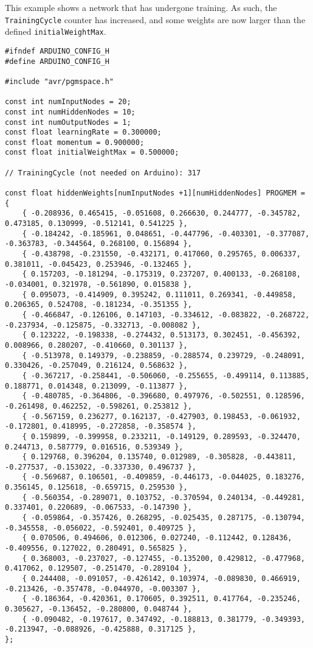 \documentclass[a4paper]{article}
\begin{document}
This example shows a network that has undergone training. As such, the \lstinline{TrainingCycle} counter has increased, and some weights are now larger than the defined \lstinline{initialWeightMax}.

\begin{lstlisting}
#ifndef ARDUINO_CONFIG_H
#define ARDUINO_CONFIG_H

#include "avr/pgmspace.h"

const int numInputNodes = 20;
const int numHiddenNodes = 10;
const int numOutputNodes = 1;
const float learningRate = 0.300000;
const float momentum = 0.900000;
const float initialWeightMax = 0.500000;

// TrainingCycle (not needed on Arduino): 317

const float hiddenWeights[numInputNodes +1][numHiddenNodes] PROGMEM = {
    { -0.208936, 0.465415, -0.051608, 0.266630, 0.244777, -0.345782, 0.473185, 0.130999, -0.512141, 0.541225 }, 
    { -0.184242, -0.185961, 0.048651, -0.447796, -0.403301, -0.377087, -0.363783, -0.344564, 0.268100, 0.156894 }, 
    { -0.438798, -0.231550, -0.432171, 0.417060, 0.295765, 0.006337, 0.381011, -0.045423, 0.253946, -0.132465 }, 
    { 0.157203, -0.181294, -0.175319, 0.237207, 0.400133, -0.268108, -0.034001, 0.321978, -0.561890, 0.015838 }, 
    { 0.095073, -0.414909, 0.395242, 0.111011, 0.269341, -0.449858, 0.206365, 0.524708, -0.181234, -0.351355 }, 
    { -0.466847, -0.126106, 0.147103, -0.334612, -0.083822, -0.268722, -0.237934, -0.125875, -0.332713, -0.008082 }, 
    { 0.123222, -0.198338, -0.274432, 0.513173, 0.302451, -0.456392, 0.008966, 0.280207, -0.410660, 0.301137 }, 
    { -0.513978, 0.149379, -0.238859, -0.288574, 0.239729, -0.248091, 0.330426, -0.257049, 0.216124, 0.568632 }, 
    { -0.367217, -0.258441, -0.506060, -0.255655, -0.499114, 0.113885, 0.188771, 0.014348, 0.213099, -0.113877 }, 
    { -0.480785, -0.364806, -0.396680, 0.497976, -0.502551, 0.128596, -0.261498, 0.462252, -0.598261, 0.253812 }, 
    { -0.567159, 0.236277, 0.162137, -0.427903, 0.198453, -0.061932, -0.172801, 0.418995, -0.272858, -0.358574 }, 
    { 0.159899, -0.399958, 0.233211, -0.149129, 0.289593, -0.324470, 0.244713, 0.587779, 0.016516, 0.539349 }, 
    { 0.129768, 0.396204, 0.135740, 0.012989, -0.305828, -0.443811, -0.277537, -0.153022, -0.337330, 0.496737 }, 
    { -0.569687, 0.106501, -0.409859, -0.446173, -0.044025, 0.183276, 0.356145, 0.125618, -0.659715, 0.259530 }, 
    { -0.560354, -0.289071, 0.103752, -0.370594, 0.240134, -0.449281, 0.337401, 0.220689, -0.067533, -0.147390 }, 
    { -0.059864, -0.357426, 0.268295, -0.025435, 0.287175, -0.130794, -0.345558, -0.056022, -0.592401, 0.409725 }, 
    { 0.070506, 0.494606, 0.012306, 0.027240, -0.112442, 0.128436, -0.409556, 0.127022, 0.280491, 0.565825 }, 
    { 0.368003, -0.237027, -0.127455, -0.135200, 0.429812, -0.477968, 0.417062, 0.129507, -0.251470, -0.289104 }, 
    { 0.244408, -0.091057, -0.426142, 0.103974, -0.089830, 0.466919, -0.213426, -0.357478, -0.044970, -0.003307 }, 
    { -0.186364, -0.420361, 0.170605, 0.392511, 0.417764, -0.235246, 0.305627, -0.136452, -0.280800, 0.048744 }, 
    { -0.090482, -0.197617, 0.347492, -0.188813, 0.381779, -0.349393, -0.213947, -0.088926, -0.425888, 0.317125 }, 
};


\end{lstlisting}
\end{document}
